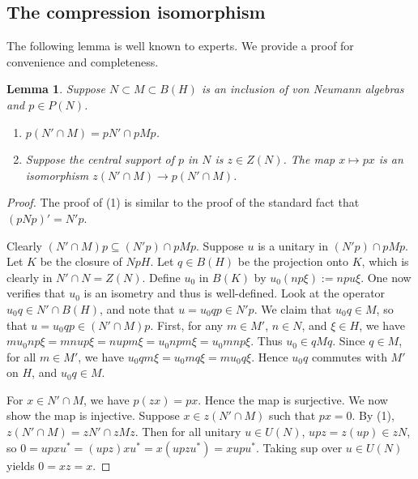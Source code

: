 \documentclass[11pt]{article}
\theoremstyle{plain}
\newtheorem{lem}[thm]{Lemma}
\theoremstyle{definition}
\begin{document}
\subsection{The compression isomorphism}
\label{sec:CompressionIso}

The following lemma is well known to experts. 
We provide a proof for convenience and completeness.

\begin{lem}
\label{lem:CompressRelativeCommutant}
Suppose $N\subset M\subset B(H)$ is an inclusion of von Neumann algebras and $p\in P(N)$.
\begin{enumerate}[label={\rm(\arabic*)}]
\item
$p(N'\cap M) = pN' \cap pMp$.
\item
Suppose the central support of $p$ in $N$ is $z\in Z(N)$.
The map $x\mapsto px$ is an isomorphism $z(N'\cap M) \to p(N'\cap M)$.
\end{enumerate}
\end{lem}
\begin{proof}
\mbox{}
\item[\underline{Proof of (1):}]
The proof of (1) is similar to the proof of the standard fact that $(pNp)' = N'p$.

Clearly $(N'\cap M)p \subseteq (N'p) \cap pMp$.
Suppose $u$ is a unitary in $(N'p) \cap pMp$.
Let $K$ be the closure of $NpH$.
Let $q\in B(H)$ be the projection onto $K$, which is clearly in $N' \cap N = Z(N)$.
Define $u_0$ in $B(K)$ by $u_0 (np\xi) := npu\xi$.
One now verifies that $u_0$ is an isometry and thus is well-defined.
Look at the operator $u_0q \in N' \cap B(H)$, and note that $u = u_0qp \in N'p$.
We claim that $u_0q \in M$, so that $u = u_0qp \in (N' \cap M)p$.
First, for any $m \in M'$, $n \in N$, and $\xi\in H$,
we have
$mu_0np\xi  = mnup\xi = nupm\xi = u_0npm\xi = u_0mnp\xi$.
Thus $u_0 \in qMq$.
Since $q \in M$, for all $m \in M'$, we have $u_0qm\xi = u_0mq\xi = mu_0q\xi$.
Hence $u_0q$ commutes with $M'$ on $H$, and $u_0q \in M$. 

\item[\underline{Proof of (2):}]
For $x\in N'\cap M$, we have $p(zx) = px$.
Hence the map is surjective.
We now show the map is injective.
Suppose $x \in z(N'\cap M)$ such that $px = 0$.
By (1), $z(N'\cap M) = zN' \cap zMz$.
Then for all unitary $u\in U(N)$, $upz = z(up) \in zN$, so 
$0 = upxu^* = (upz)xu^* = x(upzu^*) = xupu^*$.
Taking sup over $u \in U(N)$ yields $0 = xz = x$.
\end{proof}
\end{document}
